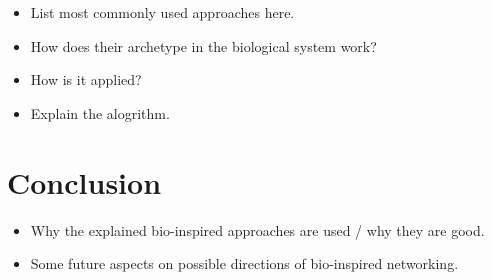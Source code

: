 \documentclass{IWORK2014}
\begin{document}
\begin{itemize}
	\item List most commonly used approaches here.
	\item How does their archetype in the biological system work?
	\item How is it applied?
	\item Explain the alogrithm.
\end{itemize}

\section{Conclusion}
\begin{itemize}
	\item Why the explained bio-inspired approaches are used / why they are good.
	\item Some future aspects on possible directions of bio-inspired networking.
\end{itemize}




\end{document}

